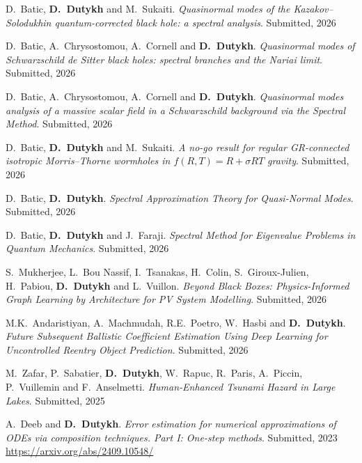\begin{etaremune}

  \item D.~Batic, \textbf{D.~Dutykh} and M.~Sukaiti. \textit{Quasinormal modes of the Kazakov--Solodukhin quantum-corrected black hole: a spectral analysis}. Submitted, 2026 %

  \item D.~Batic, A.~Chrysostomou, A.~Cornell and \textbf{D.~Dutykh}. \textit{Quasinormal modes of Schwarzschild de Sitter black holes: spectral branches and the Nariai limit}. Submitted, 2026 %

  \item D.~Batic, A.~Chrysostomou, A.~Cornell and \textbf{D.~Dutykh}. \textit{Quasinormal modes analysis of a massive scalar field in a Schwarzschild background via the Spectral Method}. Submitted, 2026 %

  \item D.~Batic, \textbf{D.~Dutykh} and M.~Sukaiti. \textit{A no-go result for regular GR-connected isotropic Morris--Thorne wormholes in $f(R, T) = R + \sigma R T$ gravity}. Submitted, 2026 %
  
  \item D.~Batic, \textbf{D.~Dutykh}. \textit{Spectral Approximation Theory for Quasi-Normal Modes}. Submitted, 2026 %

  \item D.~Batic, \textbf{D.~Dutykh} and J.~Faraji. \textit{Spectral Method for Eigenvalue Problems in Quantum Mechanics}. Submitted, 2026 %

  \item S.~Mukherjee, L.~Bou Nassif, I.~Tsanakas, H.~Colin, S.~Giroux-Julien, H.~Pabiou, \textbf{D.~Dutykh} and L.~Vuillon. \textit{Beyond Black Boxes: Physics-Informed Graph Learning by Architecture for PV System Modelling}. Submitted, 2026 %

  \item M.K.~Andaristiyan, A.~Machmudah, R.E.~Poetro, W.~Hasbi and \textbf{D.~Dutykh}. \textit{Future Subsequent Ballistic Coefficient Estimation Using Deep Learning for Uncontrolled Reentry Object Prediction}. Submitted, 2026 %

  \item M.~Zafar, P.~Sabatier, \textbf{D.~Dutykh}, W.~Rapuc, R.~Paris, A.~Piccin, P.~Vuillemin and F.~Anselmetti. \textit{Human-Enhanced Tsunami Hazard in Large Lakes}. Submitted, 2025 %

  \item A.~Deeb and \textbf{D.~Dutykh}. \textit{Error estimation for numerical approximations of ODEs via composition techniques. Part I: One-step methods}. Submitted, 2023 \\ %
  \url{https://arxiv.org/abs/2409.10548/}

\end{etaremune}

